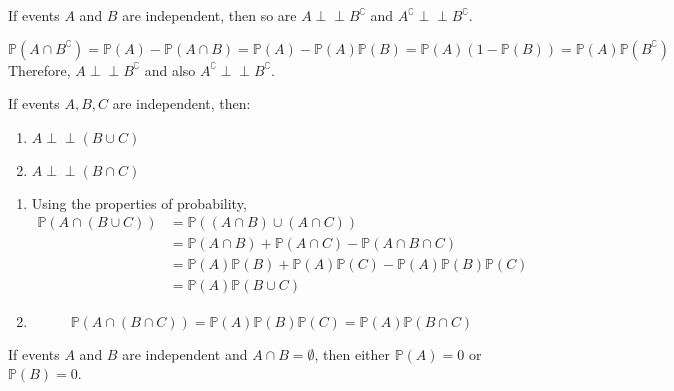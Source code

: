 \documentclass{huhtakm-template-book}
\newcommand{\independent}{\perp\!\!\!\perp}
\newcommand{\prob}{\mathbb{P}}
\begin{document}
    \begin{prop}
        If events $A$ and $B$ are independent, then so are $A\independent B^{\complement}$ and $A^{\complement}\independent B^{\complement}$.
    \end{prop}
    \begin{proofing}
        \begin{equation*}
            \prob(A\cap B^{\complement})=\prob(A)-\prob(A\cap B)=\prob(A)-\prob(A)\prob(B)=\prob(A)(1-\prob(B))=\prob(A)\prob(B^{\complement})
        \end{equation*}
        Therefore, $A\independent B^{\complement}$ and also $A^{\complement}\independent B^{\complement}$.
    \end{proofing}
    \begin{prop}
        If events $A,B,C$ are independent, then:
        \begin{enumerate}
            \item $A\independent(B\cup C)$
            \item $A\independent(B\cap C)$
        \end{enumerate}
    \end{prop}
    \begin{proofing}
        \begin{enumerate}
            \item Using the properties of probability,
            \begin{align*}
                \prob(A\cap(B\cup C))&=\prob((A\cap B)\cup(A\cap C))\\
                &=\prob(A\cap B)+\prob(A\cap C)-\prob(A\cap B\cap C)\\
                &=\prob(A)\prob(B)+\prob(A)\prob(C)-\prob(A)\prob(B)\prob(C)\\
                &=\prob(A)\prob(B\cup C)
            \end{align*}
            \item
            \begin{equation*}
                \prob(A\cap(B\cap C))=\prob(A)\prob(B)\prob(C)=\prob(A)\prob(B\cap C)
            \end{equation*}
        \end{enumerate}
    \end{proofing}
    \begin{rem}
        If events $A$ and $B$ are independent and $A\cap B=\emptyset$, then either $\prob(A)=0$ or $\prob(B)=0$.
    \end{rem}
    \newpage
\end{document}
